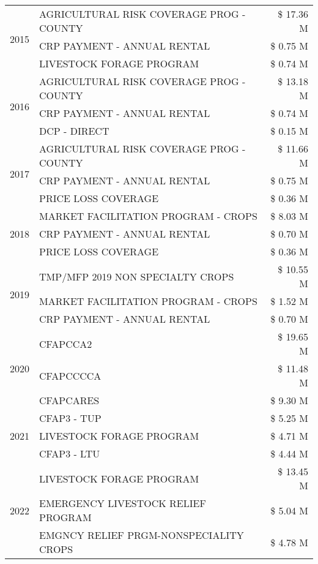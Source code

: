 \begin{tabular}{llr}
\cline{1-3}
\multirow[t]{3}{*}{2015} & AGRICULTURAL RISK COVERAGE PROG - COUNTY & \$ 17.36 M \\
 & CRP PAYMENT - ANNUAL RENTAL & \$ 0.75 M \\
 & LIVESTOCK FORAGE PROGRAM & \$ 0.74 M \\
\cline{1-3}
\multirow[t]{3}{*}{2016} & AGRICULTURAL RISK COVERAGE PROG - COUNTY & \$ 13.18 M \\
 & CRP PAYMENT - ANNUAL RENTAL & \$ 0.74 M \\
 & DCP - DIRECT & \$ 0.15 M \\
\cline{1-3}
\multirow[t]{3}{*}{2017} & AGRICULTURAL RISK COVERAGE PROG - COUNTY & \$ 11.66 M \\
 & CRP PAYMENT - ANNUAL RENTAL & \$ 0.75 M \\
 & PRICE LOSS COVERAGE & \$ 0.36 M \\
\cline{1-3}
\multirow[t]{3}{*}{2018} & MARKET FACILITATION PROGRAM - CROPS & \$ 8.03 M \\
 & CRP PAYMENT - ANNUAL RENTAL & \$ 0.70 M \\
 & PRICE LOSS COVERAGE & \$ 0.36 M \\
\cline{1-3}
\multirow[t]{3}{*}{2019} & TMP/MFP 2019 NON SPECIALTY CROPS & \$ 10.55 M \\
 & MARKET FACILITATION PROGRAM - CROPS & \$ 1.52 M \\
 & CRP PAYMENT - ANNUAL RENTAL & \$ 0.70 M \\
\cline{1-3}
\multirow[t]{3}{*}{2020} & CFAPCCA2 & \$ 19.65 M \\
 & CFAPCCCCA & \$ 11.48 M \\
 & CFAPCARES & \$ 9.30 M \\
\cline{1-3}
\multirow[t]{3}{*}{2021} & CFAP3 - TUP & \$ 5.25 M \\
 & LIVESTOCK FORAGE PROGRAM & \$ 4.71 M \\
 & CFAP3 - LTU & \$ 4.44 M \\
\cline{1-3}
\multirow[t]{3}{*}{2022} & LIVESTOCK FORAGE PROGRAM & \$ 13.45 M \\
 & EMERGENCY LIVESTOCK RELIEF PROGRAM & \$ 5.04 M \\
 & EMGNCY RELIEF PRGM-NONSPECIALITY CROPS & \$ 4.78 M \\
\cline{1-3}
\bottomrule
\end{tabular}
